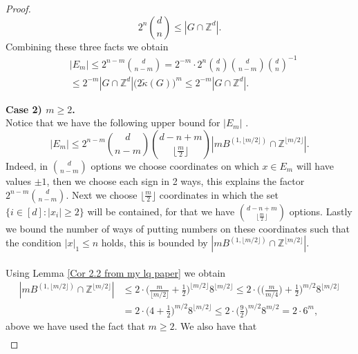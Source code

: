 \documentclass[10pt,a4paper]{amsart}
\numberwithin{equation}{section}
\newcommand{\Z}{\mathbb{Z}}
\begin{document}
\begin{proof}
\begin{equation}
 2^n \binom{d}{n} \leq |G \cap \mathbb{Z}^d |.
\end{equation}
Combining these three facts we obtain
\begin{align*}
    &|E_m| \le 2^{n-m} \binom{d}{n-m}= 2^{-m} \cdot 2^{n} \binom{d}{n} \binom{d}{n-m}  \binom{d}{n}^{-1} \\
    &\le 2^{-m} |G \cap \Z^d| \Big( 2\widetilde{\kappa}(G)\Big)^m \le 2^{-m} |G \cap \Z^d|.
\end{align*}
\par \textbf{Case 2) $m \ge 2$.} \\
Notice that we have the following upper bound for $|E_m|$ . 
\begin{equation} \label{eq:3.3}
|E_m| \leq 2^{n-m} \binom{d}{n-m} \binom{d-n+m}{\lfloor \frac{m}{2} \rfloor} |mB^{(1,\lfloor m/2 \rfloor)} \cap \mathbb{Z}^{\lfloor m/2\rfloor} |. 
\end{equation}
Indeed, in $\binom{d}{n-m}$ options we choose coordinates on which $x \in E_m$ will have values $\pm 1$, then we choose each sign in 2 ways, this explains the factor $2^{n-m} \binom{d}{n-m}$. Next we choose $\lfloor \frac{m}{2} \rfloor$ coordinates  in which the set $\lbrace i \in [d]: |x_i| \geq 2 \rbrace$ will be contained, for that we have $\binom{d-n+m}{\lfloor \frac{m}{2} \rfloor}$ options. Lastly we bound the number of ways of putting numbers on these coordinates such that the condition $| x |_{1} \leq n$ holds, this is bounded by $|mB^{(1,\lfloor m/2 \rfloor)} \cap \mathbb{Z}^{\lfloor m/2 \rfloor}|$. \\ \\
Using Lemma \ref{Cor 2.2 from my lq paper} we obtain 
\begin{equation} \label{eq:3.4}
    \begin{split}
        |mB^{(1,\lfloor m/2 \rfloor)} \cap \mathbb{Z}^{\lfloor m/2 \rfloor}| &\leq 2 \cdot \Big( \frac{m}{\lfloor m/2\rfloor}+\frac{1}{2} \Big)^{\lfloor m/2 \rfloor} 8^{\lfloor m/2 \rfloor} \leq 2 \cdot \Big( \Big( \frac{m}{m/4} \Big)+ \frac{1}{2} \Big)^{m/2} 8^{\lfloor m/2 \rfloor}  \\
 &= 2 \cdot\Big( 4+ \frac{1}{2} \Big)^{m/2} 8^{\lfloor m/2 \rfloor} \leq  2 \cdot\Big( \frac{9}{2} \Big)^{m/2} 8^{m/2}= 2 \cdot 6^{m},
    \end{split}
\end{equation}
above we have used the fact that $m  \geq 2$.
We also have that
\begin{equation} \label{eq:3.5}
    \begin{split}

\end{split}
\end{equation}
\end{proof}
\end{document}
